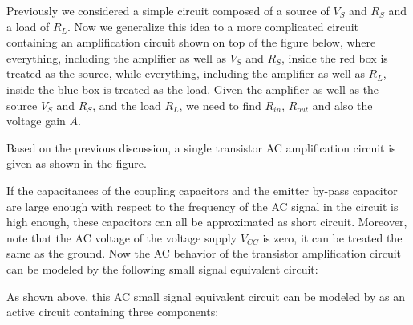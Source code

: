 Previously we considered a simple circuit composed of a source of $V_S$ and
$R_S$ and a load of $R_L$. Now we generalize this idea to a more complicated
circuit containing an amplification circuit shown on top of the figure below,
where everything, including the amplifier as well as $V_S$ and $R_S$, inside 
the red box is treated as the source, while everything, including the 
amplifier as well as $R_L$, inside the blue box is treated as the load.
Given the amplifier as well as the source $V_S$ and $R_S$, and the load 
$R_L$, we need to find $R_{in}$, $R_{out}$ and also the voltage gain $A$.


Based on the previous discussion, a single transistor AC amplification circuit 
is given as shown in the figure.


If the capacitances of the coupling capacitors and the emitter by-pass 
capacitor are large enough with respect to the frequency of the AC signal 
in the circuit is high enough, these capacitors can all be approximated as 
short circuit. Moreover, note that the AC voltage of the voltage supply
$V_{CC}$ is zero, it can be treated the same as the ground. Now the AC
behavior of the transistor amplification circuit can be modeled by the 
following small signal equivalent circuit:



As shown above, this AC small signal equivalent circuit can be modeled 
by as an active circuit containing three components:

